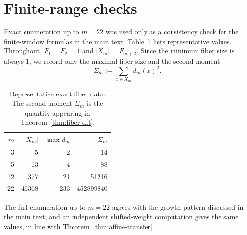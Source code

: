 \section{Finite-range checks}\label{app:sanity}

Exact enumeration up to $m=22$ was used only as a consistency check for the finite-window formulas in the main text. Table~\ref{tab:sanity-fibers} lists representative values. Throughout, $F_1=F_2=1$ and $|X_m|=F_{m+2}$. Since the minimum fiber size is always $1$, we record only the maximal fiber size and the second moment
\[
\Sigma_m:=\sum_{x\in X_m} d_m(x)^2.
\]

\begin{table}[t]
\centering
\caption{Representative exact fiber data. The second moment $\Sigma_m$ is the quantity appearing in Theorem~\ref{thm:fiber-dft}.}
\label{tab:sanity-fibers}
\renewcommand{\arraystretch}{1.15}
\begin{tabular}{rrrr}
\toprule
$m$ & $|X_m|$ & $\max d_m$ & $\Sigma_m$ \\
\midrule
3 & 5 & 2 & 14 \\
5 & 13 & 4 & 88 \\
12 & 377 & 21 & 51216 \\
22 & 46368 & 233 & 452899840 \\
\bottomrule
\end{tabular}
\end{table}

The full enumeration up to $m=22$ agrees with the growth pattern discussed in the main text, and an independent shifted-weight computation gives the same values, in line with Theorem~\ref{thm:affine-transfer}.
